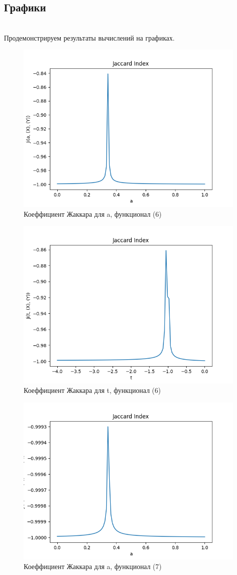 \documentclass[10pt]{article}
\begin{document}
\subsection{Графики}
\\Продемонстрируем результаты вычислений на графиках.
\begin{figure}[h!]
    \centering
    \includegraphics[width=0.75\linewidth]{Jaccadrd-a-.png}
    \caption{Коеффициент Жаккара для a, функционал (6)}
\end{figure}
\begin{figure}[h!]
    \centering
    \includegraphics[width=0.75\linewidth]{Jaccadrd-t-.png}
    \caption{Коеффициент Жаккара для t, функционал (6)}
\end{figure}

\newpage
\begin{figure}[h!]
    \centering
    \includegraphics[width=0.75\linewidth]{Jaccadrd-a-mode.png}
    \caption{Коеффициент Жаккара для a, функционал (7)}
\end{figure}
\end{document}
